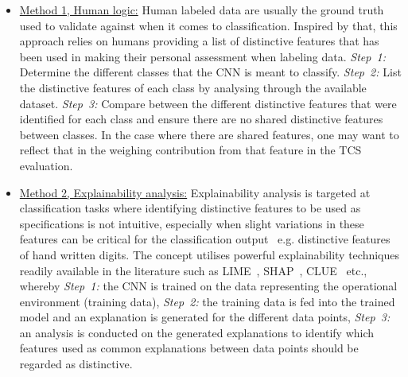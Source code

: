 \begin{itemize}
    \item 
    \underline{Method 1, Human logic:} 
    Human labeled data are usually the ground truth used to validate against when it comes to classification. Inspired by that, this approach relies on humans providing a list of distinctive features that has been used in making their personal assessment when labeling data. 
    \textit{Step~1:} Determine the different classes that the CNN is meant to classify. 
    \textit{Step~2:} List the distinctive features of each class by analysing through the available dataset. 
    \textit{Step~3:} Compare between the different distinctive features that were identified for each class and ensure there are no shared distinctive features between classes. In the case where there are shared features, one may want to reflect that in the weighing contribution from that feature in the TCS evaluation.
    
    \item \underline{Method 2, Explainability analysis:} Explainability analysis is targeted at classification tasks where identifying distinctive features to be used as specifications is not intuitive, especially when slight variations in these features can be critical for the classification output~\cite{Antoran2020} e.g. distinctive features of hand written digits.
    The concept utilises powerful explainability techniques readily available in the literature such as LIME~\cite{Ribeiro2016}, SHAP~\cite{Lundberg2017}, CLUE~\cite{Antoran2020} etc., whereby 
    \textit{Step~1:} the CNN is trained on the data representing the operational environment (training data), 
    \textit{Step~2:} the training data is fed into the trained model and an explanation is generated for the different data points, 
    \textit{Step~3:} an analysis is conducted on the generated explanations to identify which features used as common explanations between data points should be regarded as distinctive.


\end{itemize}
